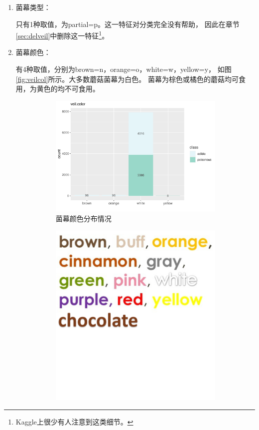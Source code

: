 \documentclass[lang=cn,11pt,a4paper,cite=super]{elegantpaper}
\begin{document}
\begin{enumerate}
   \item 菌幕类型：\par 只有1种取值，为partial=p。这一特征对分类完全没有帮助，
   因此在章节\ref{sec:delveil}中删除这一特征\footnote{Kaggle上很少有人注意到这类细节。}。

   \item 菌幕颜色：\par 有4种取值，分别为brown=n，orange=o，white=w，yellow=y，
   如图\ref{fig:veilcol}所示。大多数蘑菇菌幕为白色。 菌幕为棕色或橘色的蘑菇均可食用，为黄色的均不可食用。
   \begin{figure}[hbt]
      \begin{subfigure}[b]{0.69\textwidth}
        \centering
        \includegraphics[width=\linewidth]{img/veilcolor-1.pdf}  
      \caption{菌幕颜色分布情况}
      \end{subfigure}
      \begin{subfigure}[b]{0.3\textwidth}
        \centering
        \includegraphics[width=\linewidth]{img/color.PNG}  

\end{subfigure}
\end{figure}
\end{enumerate}
\end{document}
